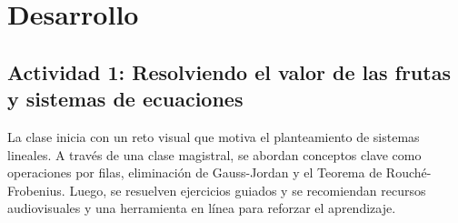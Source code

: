 \documentclass[a4,11pt]{aleph-notas}
\begin{document}
\section*{Desarrollo}  

\subsection*{Actividad 1: Resolviendo el valor de las frutas y sistemas de ecuaciones}  

La clase inicia con un reto visual que motiva el planteamiento de sistemas lineales. A través de una clase magistral, se abordan conceptos clave como operaciones por filas, eliminación de Gauss-Jordan y el Teorema de Rouché-Frobenius. Luego, se resuelven ejercicios guiados y se recomiendan recursos audiovisuales y una herramienta en línea para reforzar el aprendizaje.  
\end{document}
